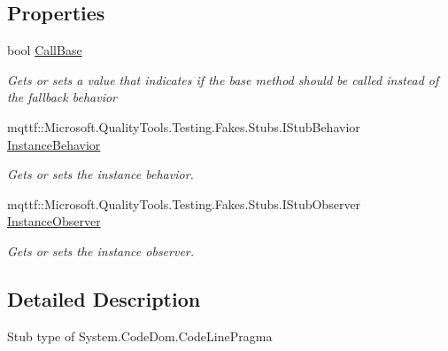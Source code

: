 \subsection*{Properties}
\begin{DoxyCompactItemize}
\item 
bool \hyperlink{class_system_1_1_code_dom_1_1_fakes_1_1_stub_code_line_pragma_a8247adf43dc34edf125067fc44552763}{Call\-Base}
\begin{DoxyCompactList}\small\item\em Gets or sets a value that indicates if the base method should be called instead of the fallback behavior\end{DoxyCompactList}\item 
mqttf\-::\-Microsoft.\-Quality\-Tools.\-Testing.\-Fakes.\-Stubs.\-I\-Stub\-Behavior \hyperlink{class_system_1_1_code_dom_1_1_fakes_1_1_stub_code_line_pragma_a8beb1284e9f0b0bf91b01f5e57afcbdd}{Instance\-Behavior}
\begin{DoxyCompactList}\small\item\em Gets or sets the instance behavior.\end{DoxyCompactList}\item 
mqttf\-::\-Microsoft.\-Quality\-Tools.\-Testing.\-Fakes.\-Stubs.\-I\-Stub\-Observer \hyperlink{class_system_1_1_code_dom_1_1_fakes_1_1_stub_code_line_pragma_ae41bf6a83d6a8490c516b057dc702279}{Instance\-Observer}
\begin{DoxyCompactList}\small\item\em Gets or sets the instance observer.\end{DoxyCompactList}\end{DoxyCompactItemize}


\subsection{Detailed Description}
Stub type of System.\-Code\-Dom.\-Code\-Line\-Pragma



